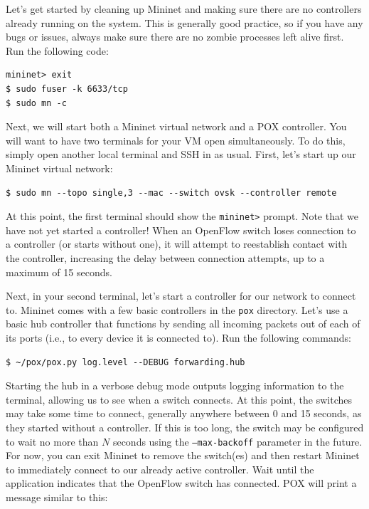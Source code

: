 \documentclass{article}
\begin{document}
\pagebreak
Let's get started by cleaning up Mininet and making sure there are no controllers already running on the system.
This is generally good practice, so if you have any bugs or issues, always make sure there are no zombie processes left alive first.
Run the following code:

\begin{topbot}
\begin{verbatim}
mininet> exit
$ sudo fuser -k 6633/tcp
$ sudo mn -c
\end{verbatim}
\end{topbot}

Next, we will start both a Mininet virtual network and a POX controller.
You will want to have two terminals for your VM open simultaneously.
To do this, simply open another local terminal and SSH in as usual.
First, let's start up our Mininet virtual network:
\begin{topbot}
\begin{verbatim}
$ sudo mn --topo single,3 --mac --switch ovsk --controller remote
\end{verbatim}
\end{topbot}

At this point, the first terminal should show the \texttt{mininet>} prompt.
Note that we have not yet started a controller!
When an OpenFlow switch loses connection to a controller (or starts without one), it will attempt to reestablish contact with the controller, increasing the delay between connection attempts, up to a maximum of 15 seconds.

Next, in your second terminal, let's start a controller for our network to connect to.
Mininet comes with a few basic controllers in the \texttt{pox} directory.
Let's use a basic hub controller that functions by sending all incoming packets out of each of its ports (i.e., to every device it is connected to).
Run the following commands:

\begin{topbot}
\begin{verbatim}
$ ~/pox/pox.py log.level --DEBUG forwarding.hub
\end{verbatim}
\end{topbot}

Starting the hub in a verbose debug mode outputs logging information to the terminal, allowing us to see when a switch connects.
At this point, the switches may take some time to connect, generally anywhere between 0 and 15 seconds, as they started without a controller.
If this is too long, the switch may be configured to wait no more than $N$ seconds using the \texttt{--max-backoff} parameter in the future.
For now, you can exit Mininet to remove the switch(es) and then restart Mininet to immediately connect to our already active controller.
Wait until the application indicates that the OpenFlow switch has connected. POX will print a message similar to this:
\end{document}
